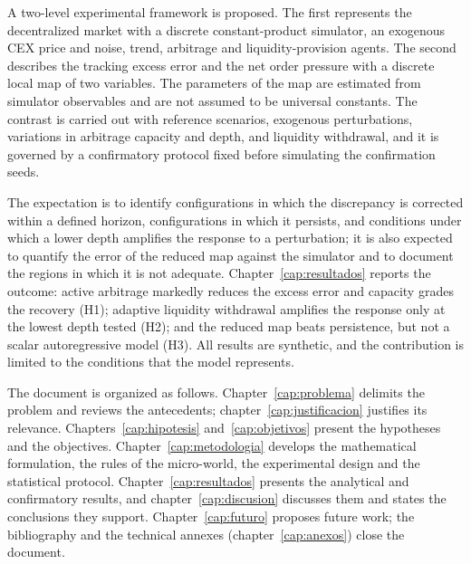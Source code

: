 A two-level experimental framework is proposed. The first represents the decentralized market with a discrete constant-product simulator, an exogenous CEX price and noise, trend, arbitrage and liquidity-provision agents. The second describes the tracking excess error and the net order pressure with a discrete local map of two variables. The parameters of the map are estimated from simulator observables and are not assumed to be universal constants. The contrast is carried out with reference scenarios, exogenous perturbations, variations in arbitrage capacity and depth, and liquidity withdrawal, and it is governed by a confirmatory protocol fixed before simulating the confirmation seeds.

The expectation is to identify configurations in which the discrepancy is corrected within a defined horizon, configurations in which it persists, and conditions under which a lower depth amplifies the response to a perturbation; it is also expected to quantify the error of the reduced map against the simulator and to document the regions in which it is not adequate. Chapter~\ref{cap:resultados} reports the outcome: active arbitrage markedly reduces the excess error and capacity grades the recovery (H1); adaptive liquidity withdrawal amplifies the response only at the lowest depth tested (H2); and the reduced map beats persistence, but not a scalar autoregressive model (H3). All results are synthetic, and the contribution is limited to the conditions that the model represents.

The document is organized as follows. Chapter~\ref{cap:problema} delimits the problem and reviews the antecedents; chapter~\ref{cap:justificacion} justifies its relevance. Chapters~\ref{cap:hipotesis} and~\ref{cap:objetivos} present the hypotheses and the objectives. Chapter~\ref{cap:metodologia} develops the mathematical formulation, the rules of the micro-world, the experimental design and the statistical protocol. Chapter~\ref{cap:resultados} presents the analytical and confirmatory results, and chapter~\ref{cap:discusion} discusses them and states the conclusions they support. Chapter~\ref{cap:futuro} proposes future work; the bibliography and the technical annexes (chapter~\ref{cap:anexos}) close the document.
